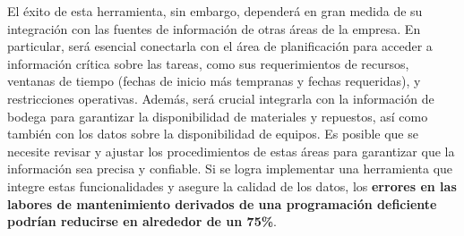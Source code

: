 \documentclass{article}
\begin{document}
El éxito de esta herramienta, sin embargo, dependerá en gran medida de su integración con las fuentes de información de otras áreas de la empresa. En particular, será esencial conectarla con el área de planificación para acceder a información crítica sobre las tareas, como sus requerimientos de recursos, ventanas de tiempo (fechas de inicio más tempranas y fechas requeridas), y restricciones operativas. Además, será crucial integrarla con la información de bodega para garantizar la disponibilidad de materiales y repuestos, así como también con los datos sobre la disponibilidad de equipos. Es posible que se necesite revisar y ajustar los procedimientos de estas áreas para garantizar que la información sea precisa y confiable. Si se logra implementar una herramienta que integre estas funcionalidades y asegure la calidad de los datos, los \textbf{errores en las labores de mantenimiento derivados de una programación deficiente podrían reducirse en alrededor de un 75\%}.
\end{document}

